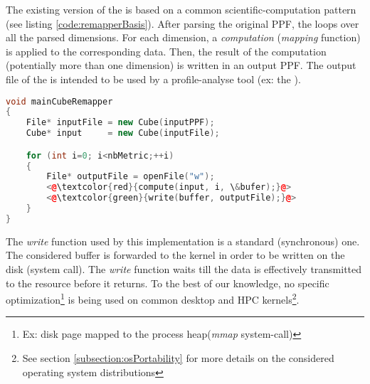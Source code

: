 	The existing version of the \toolTargetSoftware\space is based on a common scientific-computation pattern (see listing \ref{code:remapperBasis}).   After parsing the original PPF, the \toolTargetSoftware\space loops over all the parsed dimensions.   For each dimension, a \emph{computation} (\emph{mapping} function) is applied to the corresponding data.   Then, the result of the computation (potentially more than one dimension) is written in an output PPF.  The output file of the \toolTargetSoftware\space is intended to be used by a profile-analyse tool (ex: the \toolTraceAnalyzed).\\
	\begin{minipage}{\linewidth}
	\begin{lstlisting}[language=C++, caption={\toolTargetSoftware: simplified pattern}, label={code:remapperBasis}]
void mainCubeRemapper
{
    File* inputFile = new Cube(inputPPF);
    Cube* input     = new Cube(inputFile);

    for (int i=0; i<nbMetric;++i)
    {
        File* outputFile = openFile("w");
        <@\textcolor{red}{compute(input, i, \&bufer);}@>
        <@\textcolor{green}{write(buffer, outputFile);}@>
    }
}
	\end{lstlisting}
	\end{minipage}
	The \emph{write} function used by this implementation is a standard (synchronous) one.   The considered buffer is forwarded to the kernel in order to be written on the disk (system call).   The \emph{write} function waits till the data is effectively transmitted to the \notationIO\space resource before it returns.   To the best of our knowledge, no specific \notationIO\space optimization\footnote{Ex: disk page mapped to the process heap(\emph{mmap} system-call)} is being used on common desktop and HPC kernels\footnote{See section \ref{subsection:osPortability} for more details on the considered operating system distributions}.\\

